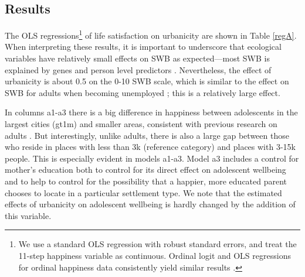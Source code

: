 \documentclass[11pt, letterpaper]{article}
\begin{document}
\begin{spacing}{1.9}
 

\section*{Results}

The OLS regressions\footnote{We use a standard OLS regression with robust
  standard errors, and treat the 11-step happiness variable as
  continuous. Ordinal logit and OLS regressions for ordinal  happiness data consistently yield similar results \citep{carbonell04}.
%                                                                                                                  
} of life satisfaction on urbanicity are shown in Table \ref{regA}.
When interpreting these results, it is important to underscore that ecological
variables have relatively small effects on SWB as
 expected---most SWB is explained by genes \citep{schnittker08} and person level
 predictors \citep{veenhoven14b}. Nevertheless, the effect of urbanicity is
 about 0.5 on the 0-10 SWB scale,  which is similar to the
effect on SWB for adults when becoming unemployed \citep{clark2008lags}; this is 
a relatively large effect. 
   
In columns a1-a3 %
there is a big difference in happiness between adolescents in the largest cities (gt1m) and smaller areas, consistent with previous research on adults \citep{aok-ls_fisher16}. But interestingly, unlike adults,
there is also a large gap between those who reside in places with less than 3k
(reference category) and places with 3-15k people. This is especially evident in
models a1-a3. %
 Model a3 includes a control for mother's education both to control for its
 direct effect on adolescent wellbeing and to help to control for the
 possibility that a happier, more educated parent chooses to locate in a
 particular settlement type. We note that the estimated effects of urbanicity on
 adolescent wellbeing is hardly changed by the addition of this variable. 



\end{spacing}
\end{document}
